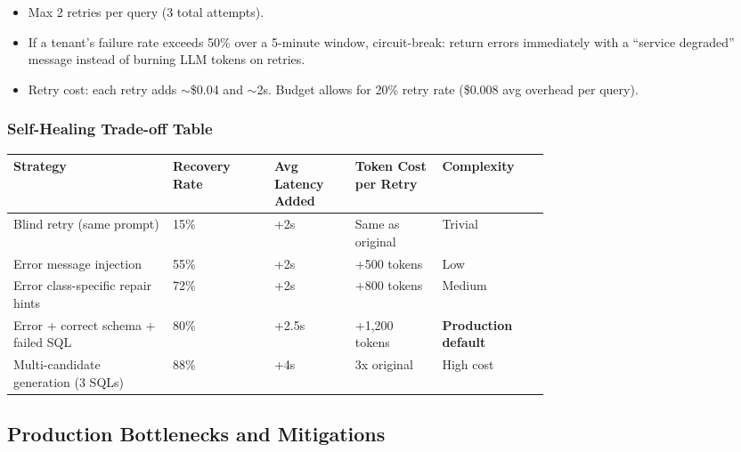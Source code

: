 \begin{itemize}
  \item Max 2 retries per query (3 total attempts).
  \item If a tenant's failure rate exceeds 50\% over a 5-minute window, circuit-break: return errors immediately with a ``service degraded'' message instead of burning LLM tokens on retries.
  \item Retry cost: each retry adds $\sim$\$0.04 and $\sim$2s. Budget allows for 20\% retry rate (\$0.008 avg overhead per query).
\end{itemize}

\subsubsection*{Self-Healing Trade-off Table}

\begin{tabular}{|p{0.22\linewidth}|p{0.14\linewidth}|p{0.10\linewidth}|p{0.12\linewidth}|p{0.12\linewidth}|}
\hline
\textbf{Strategy} & \textbf{Recovery Rate} & \textbf{Avg Latency Added} & \textbf{Token Cost per Retry} & \textbf{Complexity} \\
\hline
Blind retry (same prompt) & 15\% & +2s & Same as original & Trivial \\
\hline
Error message injection & 55\% & +2s & +500 tokens & Low \\
\hline
Error class-specific repair hints & 72\% & +2s & +800 tokens & Medium \\
\hline
Error + correct schema + failed SQL & 80\% & +2.5s & +1,200 tokens & \textbf{Production default} \\
\hline
Multi-candidate generation (3 SQLs) & 88\% & +4s & 3x original & High cost \\
\hline
\end{tabular}

\subsection*{Production Bottlenecks and Mitigations}

